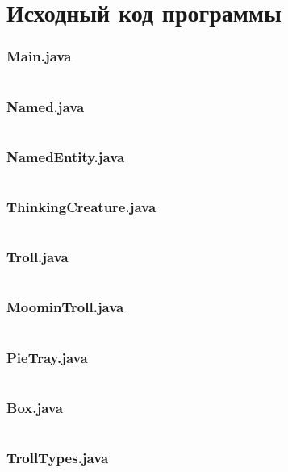 \documentclass[11pt]{article}
\begin{document}
\section{Исходный код программы}
\small
\subsubsection{Main.java}
\inputminted[linenos]{java}{../prog3lab/src/main/java/com/kupp/prog3lab/Main.java}
\subsubsection{Named.java}
\inputminted[linenos]{java}{../prog3lab/src/main/java/com/kupp/prog3lab/Named.java}
\subsubsection{NamedEntity.java}
\inputminted[linenos]{java}{../prog3lab/src/main/java/com/kupp/prog3lab/NamedEntity.java}
\subsubsection{ThinkingCreature.java}
\inputminted[linenos]{java}{../prog3lab/src/main/java/com/kupp/prog3lab/ThinkingCreature.java}
\subsubsection{Troll.java}
\inputminted[linenos]{java}{../prog3lab/src/main/java/com/kupp/prog3lab/Troll.java}
\subsubsection{MoominTroll.java}
\inputminted[linenos]{java}{../prog3lab/src/main/java/com/kupp/prog3lab/MoominTroll.java}
\subsubsection{PieTray.java}
\inputminted[linenos]{java}{../prog3lab/src/main/java/com/kupp/prog3lab/PieTray.java}
\subsubsection{Box.java}
\inputminted[linenos]{java}{../prog3lab/src/main/java/com/kupp/prog3lab/Box.java}
\subsubsection{TrollTypes.java}
\inputminted[linenos]{java}{../prog3lab/src/main/java/com/kupp/prog3lab/TrollTypes.java}
\end{document}
